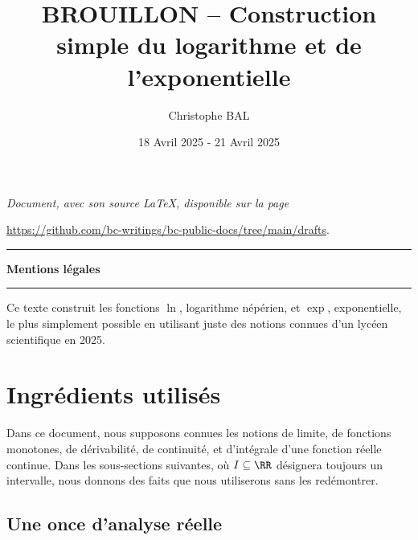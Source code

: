 \documentclass[12pt]{amsart}
\begin{document}
\title{BROUILLON -- Construction simple du logarithme et de l'exponentielle}
\author{Christophe BAL}
\date{18 Avril 2025 - 21 Avril 2025}

\maketitle

\begin{center}
	\itshape
	Document, avec son source \LaTeX, disponible sur la page

	\url{https://github.com/bc-writings/bc-public-docs/tree/main/drafts}.
\end{center}


\bigskip


\begin{center}
	\hrule\vspace{.3em}
	{
		\fontsize{1.35em}{1em}\selectfont
		\textbf{Mentions \og légales \fg}
	}

	\vspace{0.45em}
	\doclicenseThis
	\hrule
\end{center}


\bigskip


\setcounter{tocdepth}{2}
\tableofcontents




\newpage

\begin{meta-abstract*}
	Ce texte construit les fonctions $\ln$, logarithme népérien, et $\exp$, exponentielle, le plus simplement possible en utilisant juste des notions connues d'un lycéen scientifique en 2025.
\end{meta-abstract*}




\section{Ingrédients utilisés}

Dans ce document,
nous supposons connues les notions
de limite,
de fonctions monotones,
de dérivabilité,
de continuité,
et
d'intégrale d'une fonction réelle continue.
%
Dans les sous-sections suivantes, où $I \subseteq \RR$ désignera toujours un intervalle, nous donnons des faits que nous utiliserons sans les redémontrer.


	\subsection{Une once d'analyse réelle}
\end{document}

